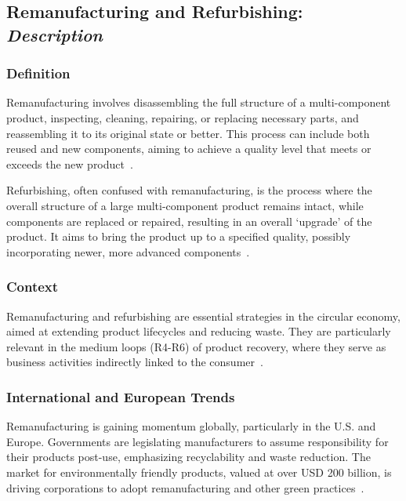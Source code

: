 \subsection{Remanufacturing and Refurbishing: \textit{Description}}

\subsubsection{Definition}
Remanufacturing involves disassembling the full structure of a multi-component product, inspecting, cleaning, repairing, or replacing necessary parts, and reassembling it to its original state or better. This process can include both reused and new components, aiming to achieve a quality level that meets or exceeds the new product~\cite{reike2018rex, sihvonena2015reman, zhang2012reman}.

Refurbishing, often confused with remanufacturing, is the process where the overall structure of a large multi-component product remains intact, while components are replaced or repaired, resulting in an overall ‘upgrade’ of the product. It aims to bring the product up to a specified quality, possibly incorporating newer, more advanced components~\cite{reike2018rex}.


\subsubsection{Context}
Remanufacturing and refurbishing are essential strategies in the circular economy, aimed at extending product lifecycles and reducing waste. They are particularly relevant in the medium loops (R4-R6) of product recovery, where they serve as business activities indirectly linked to the consumer~\cite{eu2015reman}.

\subsubsection{International and European Trends}
Remanufacturing is gaining momentum globally, particularly in the U.S. and Europe. Governments are legislating manufacturers to assume responsibility for their products post-use, emphasizing recyclability and waste reduction. The market for environmentally friendly products, valued at over USD 200 billion, is driving corporations to adopt remanufacturing and other green practices~\cite{mitra2005reman,irp2018manufacturing}.

